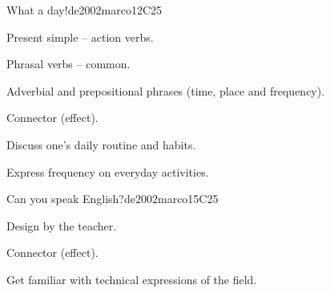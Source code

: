 \begin{syllabus}
\begin{unit}{What a day!}{}{de2002marco}{12}{C25}
   \begin{topics}
      \item Present simple – action verbs.
      \item Phrasal verbs – common.
      \item Adverbial and prepositional phrases (time, place and frequency).
      \item Connector (effect).
   \end{topics}

   \begin{learningoutcomes}
      \item Discuss one’s daily routine and habits.
      \item Express frequency on everyday activities.
   \end{learningoutcomes}
\end{unit}

\begin{unit}{Can you speak English?}{}{de2002marco}{15}{C25}
   \begin{topics}
      \item Design by the teacher.
      \item Connector (effect).
   \end{topics}

   \begin{learningoutcomes}
      \item Get familiar with technical expressions of the field.
   \end{learningoutcomes}
\end{unit}

\begin{coursebibliography}
\end{coursebibliography}

\end{syllabus}
%
